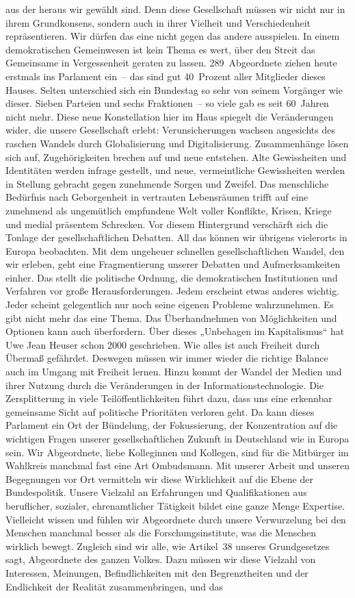 \documentclass[10pt, a4paper]{report}
\begin{document}
aus der heraus wir gewählt sind. Denn diese Gesellschaft müssen wir nicht nur in ihrem Grundkonsens, sondern auch in ihrer Vielheit und Verschiedenheit repräsentieren. Wir dürfen das eine nicht gegen das andere ausspielen. In einem demokratischen Gemeinwesen ist kein Thema es wert, über den Streit das Gemeinsame in Vergessenheit geraten zu lassen. 289 Abgeordnete ziehen heute erstmals ins Parlament ein – das sind gut 40 Prozent aller Mitglieder dieses Hauses. Selten unterschied sich ein Bundestag so sehr von seinem Vorgänger wie dieser. Sieben Parteien und sechs Fraktionen – so viele gab es seit 60 Jahren nicht mehr. Diese neue Konstellation hier im Haus spiegelt die Veränderungen wider, die unsere Gesellschaft erlebt: Verunsicherungen wachsen angesichts des raschen Wandels durch Globalisierung und Digitalisierung. Zusammenhänge lösen sich auf, Zugehörigkeiten brechen auf und neue entstehen. Alte Gewissheiten und Identitäten werden infrage gestellt, und neue, vermeintliche Gewissheiten werden in Stellung gebracht gegen zunehmende Sorgen und Zweifel. Das menschliche Bedürfnis nach Geborgenheit in vertrauten Lebensräumen trifft auf eine zunehmend als ungemütlich empfundene Welt voller Konflikte, Krisen, Kriege und medial präsentem Schrecken. Vor diesem Hintergrund verschärft sich die Tonlage der gesellschaftlichen Debatten. All das können wir übrigens vielerorts in Europa beobachten. Mit dem ungeheuer schnellen gesellschaftlichen Wandel, den wir erleben, geht eine Fragmentierung unserer Debatten und Aufmerksamkeiten einher. Das stellt die politische Ordnung, die demokratischen Institutionen und Verfahren vor große Herausforderungen. Jedem erscheint etwas anderes wichtig. Jeder scheint gelegentlich nur noch seine eigenen Probleme wahrzunehmen. Es gibt nicht mehr das eine Thema. Das Überhandnehmen von Möglichkeiten und Optionen kann auch überfordern. Über dieses „Unbehagen im Kapitalismus“ hat Uwe Jean Heuser schon 2000 geschrieben. Wie alles ist auch Freiheit durch Übermaß gefährdet. Deswegen müssen wir immer wieder die richtige Balance auch im Umgang mit Freiheit lernen. Hinzu kommt der Wandel der Medien und ihrer Nutzung durch die Veränderungen in der Informationstechnologie. Die Zersplitterung in viele Teilöffentlichkeiten führt dazu, dass uns eine erkennbar gemeinsame Sicht auf politische Prioritäten verloren geht. Da kann dieses Parlament ein Ort der Bündelung, der Fokussierung, der Konzentration auf die wichtigen Fragen unserer gesellschaftlichen Zukunft in Deutschland wie in Europa sein. Wir Abgeordnete, liebe Kolleginnen und Kollegen, sind für die Mitbürger im Wahlkreis manchmal fast eine Art Ombudsmann. Mit unserer Arbeit und unseren Begegnungen vor Ort vermitteln wir diese Wirklichkeit auf die Ebene der Bundespolitik. Unsere Vielzahl an Erfahrungen und Qualifikationen aus beruflicher, sozialer, ehrenamtlicher Tätigkeit bildet eine ganze Menge Expertise. Vielleicht wissen und fühlen wir Abgeordnete durch unsere Verwurzelung bei den Menschen manchmal besser als die Forschungsinstitute, was die Menschen wirklich bewegt. Zugleich sind wir alle, wie Artikel 38 unseres Grundgesetzes sagt, Abgeordnete des ganzen Volkes. Dazu müssen wir diese Vielzahl von Interessen, Meinungen, Befindlichkeiten mit den Begrenztheiten und der Endlichkeit der Realität zusammenbringen, und das 
\end{document}

